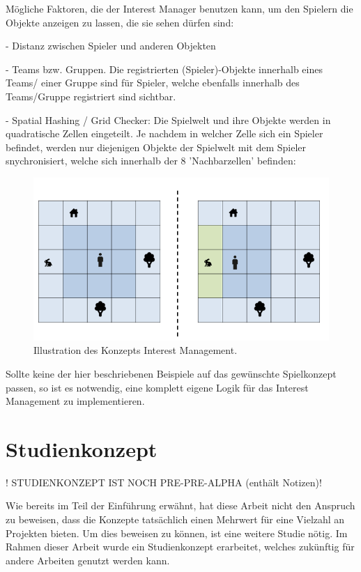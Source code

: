Mögliche Faktoren, die der Interest Manager benutzen kann, um den Spielern die Objekte anzeigen zu lassen, die sie sehen dürfen sind:

- Distanz zwischen Spieler und anderen Objekten

- Teams bzw. Gruppen. Die registrierten (Spieler)-Objekte innerhalb eines Teams/ einer Gruppe sind für Spieler, welche ebenfalls innerhalb des Teams/Gruppe registriert sind sichtbar.

- Spatial Hashing / Grid Checker: Die Spielwelt und ihre Objekte werden in quadratische Zellen eingeteilt. Je nachdem in welcher Zelle sich ein Spieler befindet, werden nur diejenigen Objekte der Spielwelt mit dem Spieler snychronisiert, welche sich innerhalb der 8 'Nachbarzellen' befinden:

\begin{figure}
	\centering
	\includegraphics[width=150mm]{images/interest_management.png}
	\caption[Interest Management]{Illustration des Konzepts Interest Management. \cite{JeromeRenaux.2017} }
	\label{pic:interest_management}
\end{figure}

Sollte keine der hier beschriebenen Beispiele auf das gewünschte Spielkonzept passen, so ist es notwendig, eine komplett eigene Logik für das Interest Management zu implementieren.

\section{Studienkonzept}
\label{studienkonzept}

! STUDIENKONZEPT IST NOCH PRE-PRE-ALPHA (enthält Notizen)!

Wie bereits im Teil der Einführung erwähnt, hat diese Arbeit nicht den Anspruch zu beweisen, dass die Konzepte tatsächlich einen Mehrwert für eine Vielzahl an Projekten bieten. Um dies beweisen zu können, ist eine weitere Studie nötig. Im Rahmen dieser Arbeit wurde ein Studienkonzept erarbeitet, welches zukünftig für andere Arbeiten genutzt werden kann.

